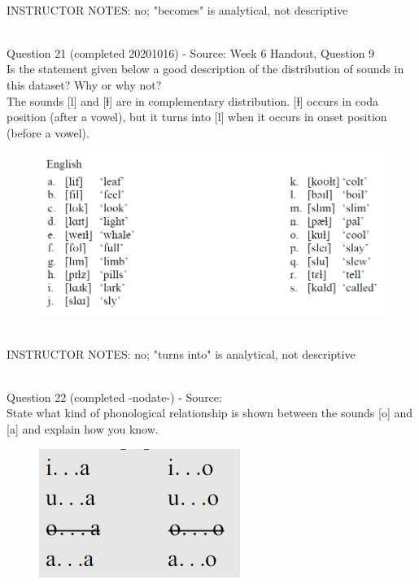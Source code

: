 \documentclass[12pt]{article}
\begin{document}
~\\
INSTRUCTOR NOTES: no; "becomes" is analytical, not descriptive


~\\

{\large Question 21} (completed 20201016) - Source: Week 6 Handout, Question 9\\

Is the statement given below a good description of the distribution of sounds in this dataset? Why or why not?\\

The sounds {[l]} and {[ɫ]} are in complementary distribution. {[ɫ]} occurs in coda position (after a vowel), but it turns into {[l]} when it occurs in onset position (before a vowel).

\begin{figure}[H]
\includegraphics{../images/english_laterals.png}
\end{figure}

~\\
INSTRUCTOR NOTES: no; "turns into" is analytical, not descriptive


~\\

{\large Question 22} (completed -nodate-) - Source: \\

State what kind of phonological relationship is shown between the sounds [o] and [a] and explain how you know.\\

\begin{figure}[H]
\includegraphics{../images/peng70ao_a.png}
\end{figure}
\end{document}

